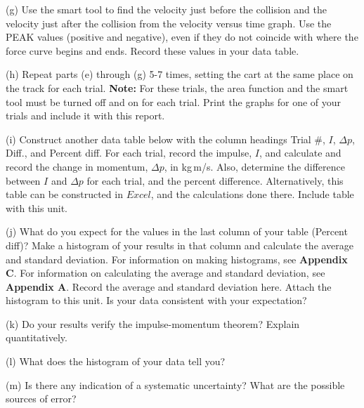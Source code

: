 (g) Use the smart tool to find the velocity just before the collision and the
velocity just after the collision from the velocity versus time graph. Use the 
PEAK values (positive and negative), even if they do not coincide with where 
the force curve begins and ends. Record these values in your data table.

(h) Repeat parts (e) through (g) 5-7 times, setting the cart at the same place on the track for each trial. \textbf{Note:} For these trials, the area function and the smart tool must be turned off and on for each trial. Print the graphs for one of your trials and include it with this report.

(i) Construct another data table below with the column headings
Trial \#, $I$, \( \Delta  p\), Diff., and Percent diff. For each trial, record
the impulse, $I$, and calculate and record the change in momentum, \( \Delta  p\), in kg\,m/s. Also, determine the difference between $I$ and $\Delta p$  for 
each trial, and the percent difference. Alternatively, this table can be constructed in $Excel$, and the calculations done there. Include table with this unit.
\vspace{70mm}

(j) What do you expect for the values in the last column of your table (Percent diff)? Make a histogram of your results in that column and calculate the average and standard deviation. For information on making histograms, see \textbf{Appendix C}. For information on calculating the average and standard deviation, see \textbf{Appendix A}. Record the average and standard deviation here.
Attach the histogram to this unit.
Is your data consistent with your expectation?
\vspace{20mm}

(k) Do your results verify the impulse-momentum theorem? Explain quantitatively.
\vspace{20mm}

(l) What does the histogram of your data tell you?
\vspace{20mm}

(m) Is there any indication of a systematic uncertainty? What are the possible
sources of error?


